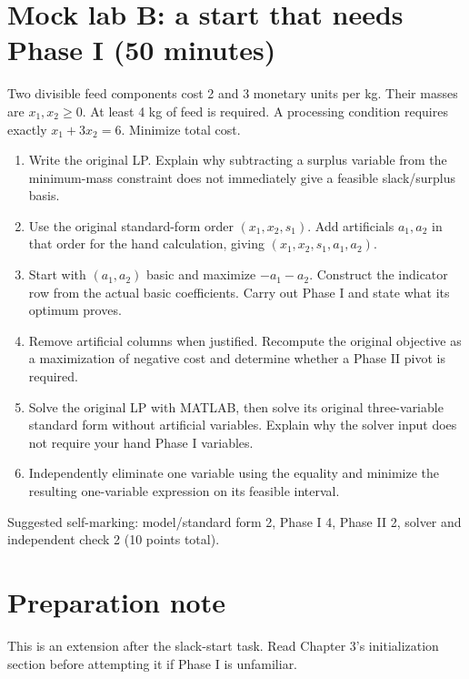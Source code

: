 \documentclass[11pt,a4paper]{article}
\begin{document}
\section{Mock lab B: a start that needs Phase I (50 minutes)}
Two divisible feed components cost 2 and 3 monetary units per kg. Their masses
are $x_1,x_2\geq0$. At least 4 kg of feed is required. A processing condition
requires exactly $x_1+3x_2=6$. Minimize total cost.
\begin{enumerate}[leftmargin=*]
  \item Write the original LP. Explain why subtracting a surplus variable
        from the minimum-mass constraint does not immediately give a feasible
        slack/surplus basis.
  \item Use the original standard-form order $(x_1,x_2,s_1)$.
        Add artificials $a_1,a_2$ in that order for the hand calculation,
        giving $(x_1,x_2,s_1,a_1,a_2)$.
  \item Start with $(a_1,a_2)$ basic and maximize $-a_1-a_2$.
        Construct the indicator row from the actual basic coefficients.
        Carry out Phase I and state what its optimum proves.
  \item Remove artificial columns when justified. Recompute the original
        objective as a maximization of negative cost and determine whether
        a Phase II pivot is required.
  \item Solve the original LP with MATLAB, then solve its original
        three-variable standard form without artificial variables. Explain
        why the solver input does not require your hand Phase I variables.
  \item Independently eliminate one variable using the equality and minimize
        the resulting one-variable expression on its feasible interval.
\end{enumerate}
Suggested self-marking: model/standard form 2, Phase I 4, Phase II 2,
solver and independent check 2 (10 points total).

\section*{Preparation note}
This is an extension after the slack-start task. Read Chapter 3's initialization
section before attempting it if Phase I is unfamiliar.

\clearpage
\end{document}
